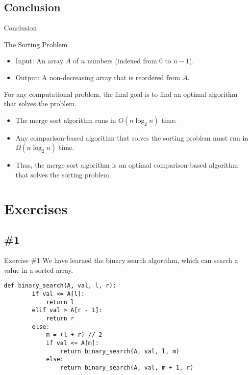 \documentclass{beamer}
\begin{document}
\subsection{Conclusion}
\begin{frame}{Conclusion}
  \begin{block}{The Sorting Problem}
    \begin{itemize}
      \item Input: An array $A$ of $n$ numbers (indexed from $0$ to $n-1$).
      \item Output: A non-decreasing array that is reordered from $A$.
    \end{itemize}
  \end{block}
  For any computational problem, the final goal is to find an optimal algorithm
  that solves the problem. \pause
  \begin{itemize}
    \item The merge sort algorithm runs in $O(n \log_2 n)$ time. \pause
    \item Any comparison-based algorithm that solves the sorting problem must
    run in $\Omega(n \log_2 n)$ time. \pause
    \item Thus, the merge sort algorithm is an optimal comparison-based
    algorithm that solves the sorting problem.
  \end{itemize}
\end{frame}

\section{Exercises}
\subsection{\#1}
\begin{frame}[fragile]{Exercise \#1}
  We have learned the binary search algorithm, which can search a value in a
  sorted array. \pause
  \begin{block}{}
    \scriptsize
    \begin{lstlisting}[gobble=4]
    def binary_search(A, val, l, r):
        if val <= A[l]:
            return l
        elif val > A[r - 1]:
            return r
        else:
            m = (l + r) // 2
            if val <= A[m]:
                return binary_search(A, val, l, m)
            else:
                return binary_search(A, val, m + 1, r)
    \end{lstlisting}
  \end{block}
\end{frame}
\end{document}
